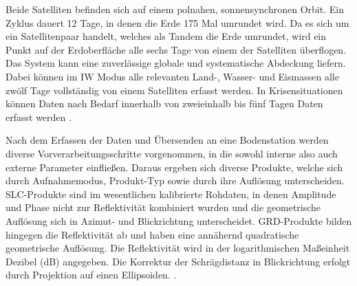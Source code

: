 Beide Satelliten befinden sich auf einem polnahen, sonnensynchronen Orbit. 
Ein Zyklus dauert 12 Tage, in denen die Erde 175 Mal umrundet wird. 
Da es sich um ein Satellitenpaar handelt, welches als Tandem die Erde umrundet, wird ein Punkt auf der Erdoberfläche alle sechs Tage von einem der Satelliten überflogen. 
Das System kann eine zuverlässige globale und systematische Abdeckung liefern. 
Dabei können im IW Modus alle relevanten Land-, Wasser- und Eismassen alle zwölf Tage vollständig von einem Satelliten erfasst werden. 
In Krisensituationen können Daten nach Bedarf innerhalb von zweieinhalb bis fünf Tagen Daten erfasst werden \cite{sentinel_1_overview}. 

Nach dem Erfassen der Daten und Übersenden an eine Bodenstation werden diverse Vorverarbeitungsschritte vorgenommen, in die sowohl interne also auch externe
Parameter einfließen. Daraus ergeben sich diverse Produkte, welche sich durch Aufnahmemodus, Produkt-Typ sowie durch ihre 
Auflösung unterscheiden. SLC-Produkte sind im wesentlichen kalibrierte Rohdaten, in denen Amplitude und Phase nicht
zur Reflektivität kombiniert wurden und die geometrische Auflösung sich in Azimut- und Blickrichtung unterscheidet. GRD-Produkte bilden hingegen die 
Reflektivität ab und haben eine annähernd quadratische geometrische Auflösung. Die Reflektivität wird in der logarithmischen Maßeinheit Dezibel (dB) angegeben. Die Korrektur 
der Schrägdistanz in Blickrichtung erfolgt durch Projektion auf einen Ellipsoiden. \cite{sentinel_1_definition}. 

